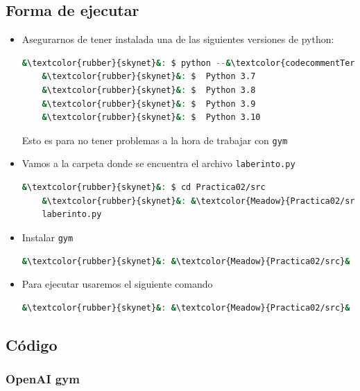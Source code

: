 \documentclass[a4paper,12pt]{article}
\begin{document}
\subsection{Forma de ejecutar}
\begin{itemize}
    \item Asegurarnos de tener instalada una de las siguientes versiones de python: \cite{docGym}
\begin{lstlisting}[language=bash]
    &\textcolor{rubber}{skynet}&: $ python --&\textcolor{codecommentTerminal}{version}&
    &\textcolor{rubber}{skynet}&: $  Python 3.7   
    &\textcolor{rubber}{skynet}&: $  Python 3.8
    &\textcolor{rubber}{skynet}&: $  Python 3.9
    &\textcolor{rubber}{skynet}&: $  Python 3.10
\end{lstlisting}
    Esto es para no tener problemas a la hora de trabajar con \texttt{gym}

    \item Vamos a la carpeta donde se encuentra el archivo \texttt{laberinto.py}
\begin{lstlisting}[language=bash]
    &\textcolor{rubber}{skynet}&: $ cd Practica02/src
    &\textcolor{rubber}{skynet}&: &\textcolor{Meadow}{Practica02/src}& $  ls         
    laberinto.py
\end{lstlisting}

    \item Instalar \texttt{gym}
\begin{lstlisting}[language=bash]    
    &\textcolor{rubber}{skynet}&: &\textcolor{Meadow}{Practica02/src}& $  pip install gym
\end{lstlisting}    

    \item Para ejecutar usaremos el siguiente comando
\begin{lstlisting}[language=bash]    
    &\textcolor{rubber}{skynet}&: &\textcolor{Meadow}{Practica02/src}& $  python laberinto.py    
\end{lstlisting}
\end{itemize}



\subsection{Código}

\subsubsection*{OpenAI gym}
\end{document}
